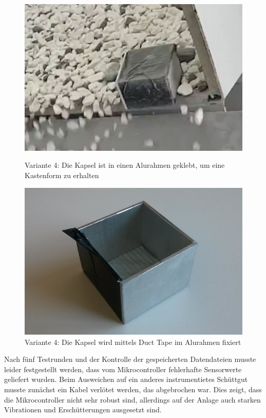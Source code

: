 \begin{figure}[htb]
	\centering
	\begin{minipage}[t]{0.49\linewidth}
		\centering
		\includegraphics[width=\linewidth]{images/k4-alu.JPG}
		\caption{Variante 4: Die Kapsel ist in einen Alurahmen geklebt, um eine Kastenform zu erhalten}
		\label{fig:k4_alu}
	\end{minipage}%
	\hfill
	\begin{minipage}[t]{0.49\linewidth}
		\centering
		\includegraphics[width=\linewidth]{images/k4-alurahmen.jpg}
		\caption{Variante 4: Die Kapsel wird mittels Duct Tape im Alurahmen fixiert}
		\label{fig:k4_alurahmen}
	\end{minipage}
\end{figure}

Nach fünf Testrunden und der Kontrolle der gespeicherten Datendateien musste leider festgestellt werden, dass vom Mikrocontroller fehlerhafte Sensorwerte geliefert wurden. Beim Ausweichen auf ein anderes instrumentietes Schüttgut musste zunächst ein Kabel verlötet werden, das abgebrochen war. Dies zeigt, dass die Mikrocontroller nicht sehr robust sind, allerdings auf der Anlage auch starken Vibrationen und Erschütterungen ausgesetzt sind.

